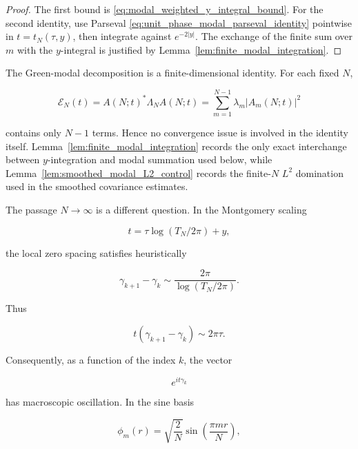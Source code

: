 \documentclass[11pt]{amsart}
\numberwithin{equation}{section}
\theoremstyle{plain}
\theoremstyle{definition}
\theoremstyle{remark}
\begin{document}
\begin{proof}
The first bound is \eqref{eq:modal_weighted_y_integral_bound}. For the
second identity, use Parseval
\eqref{eq:unit_phase_modal_parseval_identity} pointwise in
\(t=t_N(\tau,y)\), then integrate against \(e^{-2|y|}\). The exchange of
the finite sum over \(m\) with the \(y\)-integral is justified by
Lemma~\ref{lem:finite_modal_integration}.
\end{proof}

The Green-modal decomposition is a finite-dimensional identity. For each
fixed \(N\),

\begin{equation}
\mathcal E_N(t)
=
A(N;t)^*\Lambda_NA(N;t)
=
\sum_{m=1}^{N-1}\lambda_m|A_m(N;t)|^2
\end{equation}

contains only \(N-1\) terms. Hence no convergence issue is involved in
the identity itself. Lemma~\ref{lem:finite_modal_integration} records the
only exact interchange between \(y\)-integration and modal summation used
below, while Lemma~\ref{lem:smoothed_modal_L2_control} records the
finite-\(N\) \(L^2\) domination used in the smoothed covariance
estimates.

The passage \(N\to\infty\) is a different question. In the Montgomery
scaling

\begin{equation}
t=\tau\log(T_N/2\pi)+y,
\end{equation}

the local zero spacing satisfies heuristically

\begin{equation}
\gamma_{k+1}-\gamma_k\sim \frac{2\pi}{\log(T_N/2\pi)}.
\end{equation}

Thus

\begin{equation}
t(\gamma_{k+1}-\gamma_k)
\sim
2\pi\tau.
\end{equation}

Consequently, as a function of the index \(k\), the vector

\begin{equation}
e^{it\gamma_k}
\end{equation}

has macroscopic oscillation. In the sine basis

\begin{equation}
\phi_m(r)
=
\sqrt{\frac2N}
\sin\left(\frac{\pi mr}{N}\right),
\end{equation}
\end{document}

